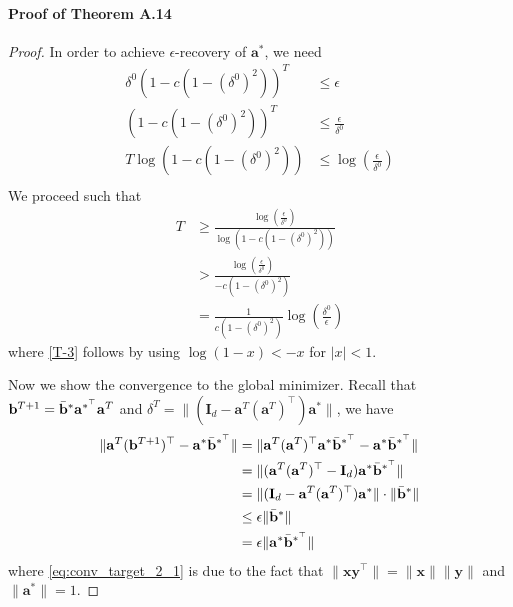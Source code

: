 \documentclass{article}
\theoremstyle{plain}
\theoremstyle{definition}
\theoremstyle{remark}
\begin{document}
\paragraph{Proof of Theorem A.14}
\begin{proof}
    In order to achieve $\epsilon$-recovery of $\mathbf{a}^*$, we need
    \begin{align}
        \delta^{0} ({1-c(1-(\delta^{0})^2)})^{T} &\leq \epsilon \\
        ({1-c (1-(\delta^{0})^2)})^{T} &\leq \frac{\epsilon}{\delta^0} \\
        T \log{({1-c (1-(\delta^{0})^2)})} &\leq \log (\frac{\epsilon}{\delta^0})  \\
        \end{align} 
        We proceed such that
        \begin{align}
        T &\geq \frac{\log (\frac{\epsilon}{\delta^0})}{\log{({1-c (1-(\delta^{0})^2)})}} \\
         &> \frac{\log (\frac{\epsilon}{\delta^0})}{-c (1-(\delta^{0})^2)} \label{T-3} \\
         &= \frac{1}{c (1-(\delta^{0})^2)} \log(\frac{\delta^0}{\epsilon}) 
    \end{align} 
    where \eqref{T-3} follows by using $\log(1-x)<-x$ for $|x|<1$.

Now we show the convergence to the global minimizer.
Recall that $\mathbf{b}^{T+1} = \Bar{\mathbf b}^{*}\mathbf{a}^{*^\top}\mathbf{a}^T$ and $\delta^T = \|  (\mathbf I_d - \mathbf{a}^T(\mathbf a^T)^\top )  \mathbf{a}^* \|$, we have
    \begin{align}
        \lVert \mathbf{a}^T({\mathbf{b}}^{T+1})^\top- \mathbf{a}^* \Bar{\mathbf b}^{*^\top}\rVert &= \lVert \mathbf{a}^T (\mathbf{a}^T)^\top \mathbf{a}^* \Bar{\mathbf b}^{*^\top}  - \mathbf{a}^* \Bar{\mathbf b}^{*^\top}\rVert \\
        & = \| (\mathbf{a}^T (\mathbf{a}^T)^\top-\mathbf{I}_d) \mathbf{a}^* \Bar{ \mathbf b}^{*^\top}\|\\
        & = \| (\mathbf{I}_d-\mathbf{a}^T (\mathbf{a}^T)^\top) \mathbf{a}^*\| \cdot \|\Bar{\mathbf b}^{*} \|\\
        &\leq \epsilon \|\Bar{\mathbf b}^{*} \| \\
        & =  \epsilon \| \mathbf{a}^* \Bar{\mathbf b}^{*^\top} \label{eq:conv_target_2_1}\|
    \end{align}
    where \eqref{eq:conv_target_2_1} is due to the fact that $\| \mathbf x \mathbf y^\top\| =\| \mathbf x \|\| \mathbf y\| $ and $\|\mathbf a^*\| = 1$.
    
\end{proof}
\end{document}
